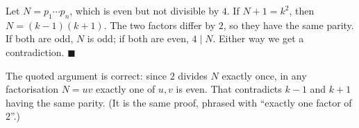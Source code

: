 Let $N=p_1\cdots p_n$, which is even but not divisible by $4$. If $N+1=k^2$, then $N=(k-1)(k+1)$. The two factors differ by $2$, so they have the same parity. If both are odd, $N$ is odd; if both are even, $4\mid N$. Either way we get a contradiction. $\blacksquare$

The quoted argument is correct: since $2$ divides $N$ exactly once, in any factorisation $N=uv$ exactly one of $u,v$ is even. That contradicts $k-1$ and $k+1$ having the same parity. (It is the same proof, phrased with ``exactly one factor of $2$''.)
